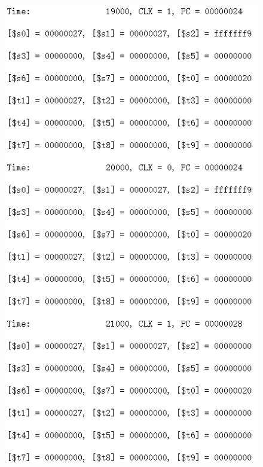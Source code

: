 \documentclass[12pt]{article}
\begin{document}
\begin{figure}[H]
\centering
\includegraphics[scale=1]{R7.jpg}
\end{figure}
\end{document}
